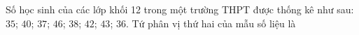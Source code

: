 \begin{ex}
Số học sinh của các lớp khối 12 trong một trường THPT được thống kê như sau: $35$; $40$; $37$; $46$; $38$; $42$; $43$; $36$. Tứ phân vị thứ hai của mẫu số liệu là
\end{ex}
